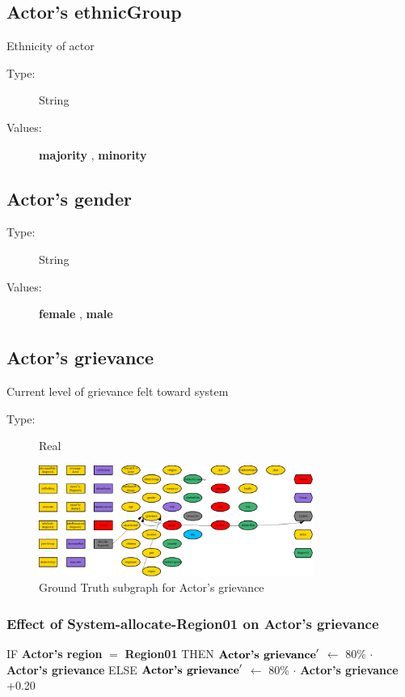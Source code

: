 \documentclass{article}%
\begin{document}
%
\subsection{Actor's ethnicGroup}%
\label{subsec:Actor's ethnicGroup}%
Ethnicity of actor%
\begin{description}%
\item[Type:]%
String%
\item[Values:]%
\textbf{majority}%
, %
\textbf{minority}%
\end{description}

%
\subsection{Actor's gender}%
\label{subsec:Actor's gender}%
\begin{description}%
\item[Type:]%
String%
\item[Values:]%
\textbf{female}%
, %
\textbf{male}%
\end{description}

%
\subsection{Actor's grievance}%
\label{subsec:Actor's grievance}%
Current level of grievance felt toward system%
\begin{description}%
\item[Type:]%
Real%
\end{description}%


\begin{figure}[ht]%
\centering%
\includegraphics[width=0.8\textwidth]{images/grievanceOfActor.png}%
\caption{Ground Truth subgraph for Actor's grievance}%
\end{figure}

%
\subsubsection{Effect of System{-}allocate{-}Region01 on Actor's grievance}%
\label{ssubsec:Effect of System{-}allocate{-}Region01 on Actor's grievance}%
\begin{flushleft}%
IF %
\textbf{Actor's region}%
$=$%
\textbf{Region01}%
\linebreak%
\hspace*{2em}%
THEN %
$\mbox{\textbf{Actor's grievance}} '$%
$\leftarrow$%
80\%%
$\cdot$%
\textbf{Actor's grievance}%
\linebreak%
\hspace*{2em}%
ELSE %
$\mbox{\textbf{Actor's grievance}} '$%
$\leftarrow$%
80\%%
$\cdot$%
\textbf{Actor's grievance}%
+0.20%
\end{flushleft}
\end{document}

